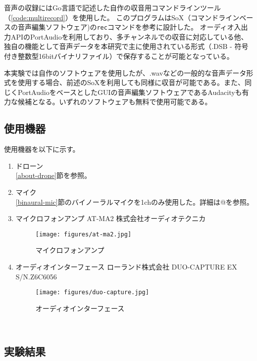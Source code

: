 音声の収録にはGo言語で記述した自作の収音用コマンドラインツール（\ref{code:multirecord}）を使用した。
このプログラムはSoX（コマンドラインベースの音声編集ソフトウェア)\cite{sox:online}の\texttt{rec}コマンドを参考に設計した。
オーディオ入出力APIのPortAudio\cite{portaudio:online}を利用しており、多チャンネルでの収音に対応している他、独自の機能として音声データを本研究で主に使用されている形式（.DSB - 符号付き整数型16bitバイナリファイル）で保存することが可能となっている。

本実験では自作のソフトウェアを使用したが、.wavなどの一般的な音声データ形式を使用する場合、前述のSoXを利用しても同様に収音が可能である。また、同じくPortAudioをベースとしたGUIの音声編集ソフトウェアであるAudacity\cite{audacity:online}も有力な候補となる。いずれのソフトウェアも無料で使用可能である。

\subsection{使用機器}\label{used-equipments-drone}

使用機器を以下に示す。

\begin{enumerate}
\renewcommand{\labelenumi}{(\arabic{enumi})}
\item
  ドローン\\
  \ref{about-drone}節を参照。
\item
  マイク \\
  \ref{binaural-mic}節のバイノーラルマイクを1chのみ使用した。詳細は@を参照。
\item
  マイクロフォンアンプ AT-MA2 株式会社オーディオテクニカ
  \begin{figure}[H]
  \centering
  \texttt{[image: figures/at-ma2.jpg]}
  \caption{マイクロフォンアンプ}
  \label{fig:at-ma2}
  \end{figure}

\item
  オーディオインターフェース ローランド株式会社 DUO-CAPTURE EX S/N.Z6C6056
  \cite{audio_interface:online}
  \begin{figure}[H]
  \centering
  \texttt{[image: figures/duo-capture.jpg]}
  \caption{オーディオインターフェース}
  \label{fig:duo-capture}
  \end{figure}
\end{enumerate}

\
\subsection{実験結果}\label{result-drone}

